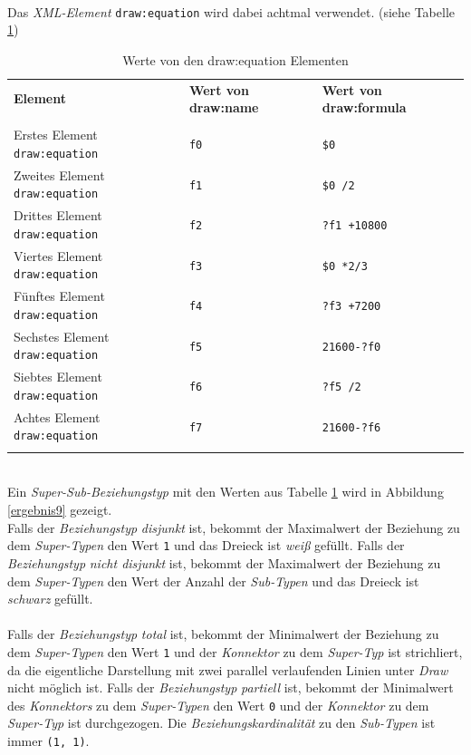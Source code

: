 \noindent
\hon{}
\\
\noindent
Das \textit{XML-Element} \verb|draw:equation| wird dabei achtmal verwendet. (siehe Tabelle \ref{tbl:beispieltabelle9})

\begin{table}[H]
	\centering
	\begin{tabular}{lll}
		\textbf{Element} & \textbf{Wert von draw:name}  & \textbf{Wert von draw:formula} \\
		\\
		Erstes Element \verb|draw:equation| & \verb|f0|           & \verb|$0|              \\
		Zweites Element \verb|draw:equation| & \verb|f1|      & \verb|$0 /2|            \\
		Drittes Element \verb|draw:equation| & \verb|f2|       & \verb|?f1 +10800|             \\
		Viertes Element \verb|draw:equation| & \verb|f3|       & \verb|$0 *2/3|             \\
		Fünftes Element \verb|draw:equation| & \verb|f4|       & \verb|?f3 +7200|             \\
		Sechstes Element \verb|draw:equation| & \verb|f5|       & \verb|21600-?f0|             \\
		Siebtes Element \verb|draw:equation| & \verb|f6|       & \verb|?f5 /2|             \\
		Achtes Element \verb|draw:equation| & \verb|f7|       & \verb|21600-?f6|             \\
		\\
	\end{tabular}
	
	\caption{Werte von den draw:equation Elementen}
	\label{tbl:beispieltabelle9}
	
\end{table}
\noindent
\hon{}
\\
\noindent
Ein \textit{Super-Sub-Beziehungstyp} mit den Werten aus Tabelle \ref{tbl:beispieltabelle9} wird in Abbildung \ref{ergebnis9} gezeigt.
\\
\noindent
Falls der \textit{Beziehungstyp} \textit{disjunkt} ist, bekommt der Maximalwert der Beziehung zu dem \textit{Super-Typen} den Wert \verb|1| und das Dreieck ist \textit{weiß} gefüllt.
Falls der \textit{Beziehungstyp} \textit{nicht disjunkt} ist, bekommt der Maximalwert der Beziehung zu dem \textit{Super-Typen} den Wert der Anzahl der \textit{Sub-Typen} und das Dreieck ist \textit{schwarz} gefüllt.
\\
\\
\noindent
Falls der \textit{Beziehungstyp} \textit{total} ist, bekommt der Minimalwert der Beziehung zu dem \textit{Super-Typen} den Wert \verb|1| und der \textit{Konnektor} zu dem \textit{Super-Typ} ist strichliert, da die eigentliche Darstellung mit zwei parallel verlaufenden Linien unter \textit{Draw} nicht möglich ist.
Falls der \textit{Beziehungstyp} \textit{partiell} ist, bekommt der Minimalwert des \textit{Konnektors} zu dem \textit{Super-Typen} den Wert \verb|0| und der \textit{Konnektor} zu dem \textit{Super-Typ} ist durchgezogen.	
Die \textit{Beziehungskardinalität} zu den \textit{Sub-Typen} ist immer \verb|(1, 1)|.

